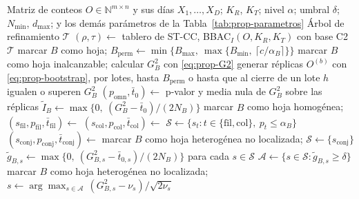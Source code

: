 \begin{algorithm}[t]
\caption{Refinamiento jerárquico de ST-CC con AST-CC}\label{alg:astcc}
\begin{algorithmic}[1]
\Require Matriz de conteos $O\in\mathbb{N}^{m\times n}$ y sus días $X_1,\dots,X_D$; $K_R$, $K_T$; nivel $\alpha$; umbral $\delta$; $N_{\min}$, $d_{\max}$; y los demás parámetros de la Tabla~\ref{tab:prop-parametros}
\Ensure Árbol de refinamiento $\mathcal{T}$
\State $(\rho,\tau)\gets$ tablero de ST-CC, BBAC$_I(O, K_R, K_T)$ con base C2 
  \State {}
\EndFor
\State \Return $\mathcal{T}$
\Statex
{}
    \State marcar $B$ como hoja; \Return
  \EndIf
  \State $B_{\mathrm{perm}}\gets\min\{B_{\max},\ \max\{B_{\min},\ \lceil c/\alpha_B\rceil\}\}$
    \State marcar $B$ como hoja inalcanzable; \Return
  \EndIf
  \State calcular $G^2_B$ con \eqref{eq:prop-G2}
  \State generar réplicas $O^{(b)}$ con \eqref{eq:prop-bootstrap}, por lotes, hasta $B_{\mathrm{perm}}$ o hasta que al cierre de un lote $h$ igualen o superen $G^2_B$ 
  \State $(p_{\mathrm{omn}}, \bar t_0)\gets$ p-valor y media nula de $G^2_B$ sobre las réplicas
  \State $\tilde I_B\gets\max\{0,\ (G^2_B-\bar t_0)/(2N_B)\}$
    \State marcar $B$ como hoja homogénea; \Return
  \EndIf
  \State $(s_{\mathrm{fil}},p_{\mathrm{fil}},\bar t_{\mathrm{fil}})\gets$ 
  \State $(s_{\mathrm{col}},p_{\mathrm{col}},\bar t_{\mathrm{col}})\gets$ 
  \State $\mathcal{S}\gets\{s_t : t\in\{\text{fil},\text{col}\},\ p_t\le\alpha_B\}$ 
    \State $(s_{\mathrm{conj}},p_{\mathrm{conj}},\bar t_{\mathrm{conj}})\gets$ 
      \State marcar $B$ como hoja heterogénea no localizada; \Return
    \EndIf
    \State $\mathcal{S}\gets\{s_{\mathrm{conj}}\}$
  \EndIf
  \State $\tilde g_{B,s}\gets\max\{0,\ (G^2_{B,s}-\bar t_{0,s})/(2N_B)\}$ para cada $s\in\mathcal{S}$ 
  \State $\mathcal{A}\gets\{s\in\mathcal{S} : \tilde g_{B,s}\ge\delta\}$ 
    \State marcar $B$ como hoja heterogénea no localizada; \Return
  \EndIf
  \State $s\gets\arg\max_{s\in\mathcal{A}}\,(G^2_{B,s}-\nu_s)/\sqrt{2\nu_s}$ 
    \State {}
  \EndFor
\EndProcedure
\end{algorithmic}
\end{algorithm}

